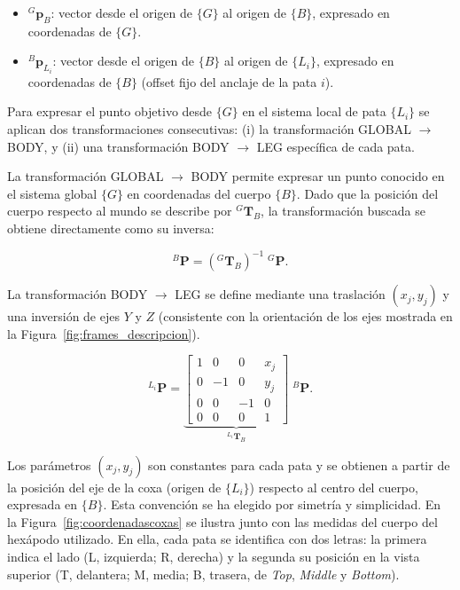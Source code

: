 \begin{itemize}
    \item ${}^{G}\bm{p}_{B}$: vector desde el origen de $\{G\}$ al origen de $\{B\}$, expresado en coordenadas de $\{G\}$.
    \item ${}^{B}\bm{p}_{L_i}$: vector desde el origen de $\{B\}$ al origen de $\{L_i\}$, expresado en coordenadas de $\{B\}$ (offset fijo del anclaje de la pata $i$).
\end{itemize}

Para expresar el punto objetivo desde $\{G\}$ en el sistema local de pata $\{L_i\}$ se aplican dos transformaciones consecutivas: (i) la transformación GLOBAL $\rightarrow$ BODY, y (ii) una transformación BODY $\rightarrow$ LEG específica de cada pata.

La transformación GLOBAL $\rightarrow$ BODY permite expresar un punto conocido en el sistema global $\{G\}$ en coordenadas del cuerpo $\{B\}$. Dado que la posición del cuerpo respecto al mundo se describe por ${}^{G}\mathbf{T}_{B}$, la transformación buscada se obtiene directamente como su inversa:

\begin{equation}
    {}^{B}{\bm{P}} = \left({}^{G}\mathbf{T}_{B}\right)^{-1}\;{}^{G}{\bm{P}}.
    \label{eq:global_to_body_hom}
\end{equation}

La transformación BODY $\rightarrow$ LEG se define mediante una traslación $(x_j,y_j)$ y una inversión de ejes $Y$ y $Z$ (consistente con la orientación de los ejes mostrada en la Figura~\ref{fig:frames_descripcion}).

\begin{equation}
    {}^{L_i}{\bm{P}} =
    \underbrace{
    \begin{bmatrix}
        1 & 0 & 0 & x_j\\
        0 & -1& 0 & y_j\\
        0 & 0 & -1& 0\\
        0 & 0 & 0 & 1
    \end{bmatrix}}_{{}^{L_i}\mathbf{T}_{B}}
    \;{}^{B}{\bm{P}}.
    \label{eq:Tlb}
\end{equation}

Los parámetros $(x_j,y_j)$ son constantes para cada pata y se obtienen a partir de la posición del eje de la coxa (origen de $\{L_i\}$) respecto al centro del cuerpo, expresada en $\{B\}$. Esta convención se ha elegido por simetría y simplicidad. En la Figura~\ref{fig:coordenadascoxas} se ilustra junto con las medidas del cuerpo del hexápodo utilizado. En ella, cada pata se identifica con dos letras: la primera indica el lado (L, izquierda; R, derecha) y la segunda su posición en la vista superior (T, delantera; M, media; B, trasera, de \textit{Top}, \textit{Middle} y \textit{Bottom}).

